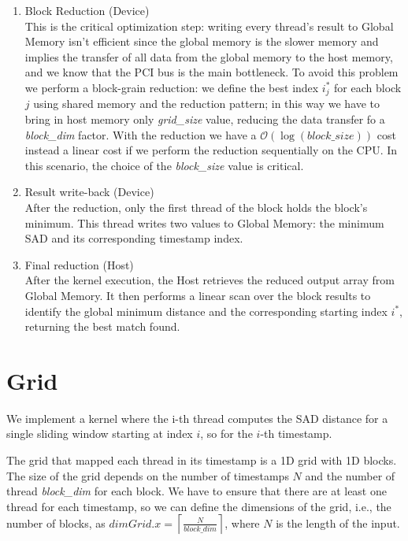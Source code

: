 \begin{enumerate}
    \item Block Reduction (Device) \\
        This is the critical optimization step: writing every thread's result to Global Memory isn't efficient since the global memory is the slower memory and implies the transfer of all data from the global memory to the host memory, and we know that the PCI bus is the main bottleneck. To avoid this problem we perform a block-grain reduction: we define the best index $i_j^*$ for each block $j$ using shared memory and the reduction pattern; in this way we have to bring in host memory only \textit{grid\_size} value, reducing the data transfer fo a \textit{block\_dim} factor. With the reduction we have a $\mathcal{O}{(\log(block\_size))}$ cost instead a linear cost if we perform the reduction sequentially on the CPU. In this scenario, the choice of the \textit{block\_size} value is critical.
    \item Result write-back (Device) \\
        After the reduction, only the first thread of the block holds the block's minimum. This thread writes two values to Global Memory: the minimum SAD and its corresponding timestamp index.
    \item Final reduction (Host) \\
        After the kernel execution, the Host retrieves the reduced output array from Global Memory. It then performs a linear scan over the block results to identify the global minimum distance and the corresponding starting index $i^*$, returning the best match found.
\end{enumerate}

\section{Grid}
We implement a kernel where the i-th thread computes the SAD distance for a single sliding window starting at index $i$, so for the $i$-th timestamp.

The grid that mapped each thread in its timestamp is a 1D grid with 1D blocks.
The size of the grid depends on the number of timestamps $N$ and the number of thread \textit{block\_dim} for each block. We have to ensure that there are at least one thread for each timestamp, so we can define the dimensions of the grid, i.e., the number of blocks, as $dimGrid.x = \left\lceil \frac{N}{block\_dim} \right\rceil$, where $N$ is the length of the input.

